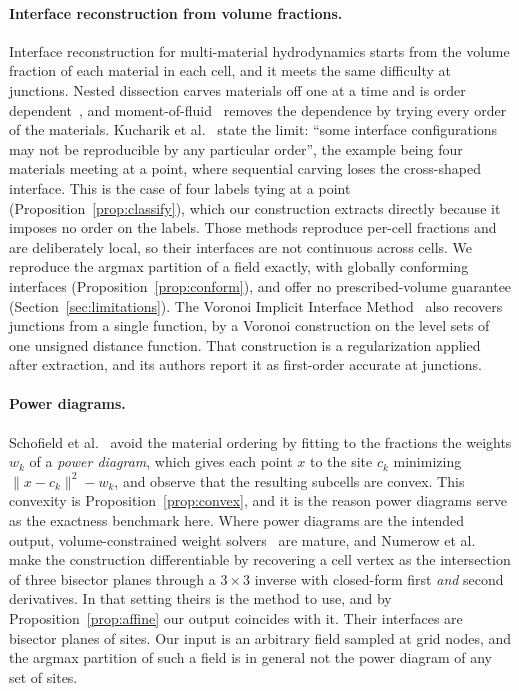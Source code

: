 \documentclass{egpubl}
\theoremstyle{definition}
\begin{document}
\paragraph{Interface reconstruction from volume fractions.}
Interface reconstruction for multi-material hydrodynamics starts from the
volume fraction of each material in each cell, and it meets the same
difficulty at junctions. Nested dissection carves materials off one at a time and is
order dependent~\cite{kucharik2010}, and moment-of-fluid~\cite{dyadechko2008}
removes the dependence by trying every order of the materials. Kucharik et
al.~\cite{kucharik2010} state the limit: ``some interface configurations may not
be reproducible by any particular order'', the example being four materials
meeting at a point, where sequential carving loses the cross-shaped interface.
This is the case of four labels tying at a point
(Proposition~\ref{prop:classify}), which our
construction extracts directly because it imposes no order on the labels.
Those methods reproduce per-cell fractions and are deliberately local, so
their interfaces are not continuous across cells. We reproduce the argmax
partition of a field exactly, with globally conforming interfaces
(Proposition~\ref{prop:conform}), and offer no prescribed-volume guarantee
(Section~\ref{sec:limitations}). The Voronoi Implicit Interface
Method~\cite{saye2011, saye2012} also recovers junctions from a single
function, by a Voronoi construction on the level sets of one unsigned
distance function. That construction is a regularization applied after
extraction, and its authors report it as first-order accurate at junctions.

\paragraph{Power diagrams.} Schofield et al.~\cite{schofield2008,
schofield2009} avoid the material ordering by fitting to the fractions the weights $w_k$
of a \emph{power diagram}, which gives each point $x$ to the site $c_k$
minimizing $\lVert x - c_k\rVert^2 - w_k$, and observe that the resulting subcells
are convex. This convexity is Proposition~\ref{prop:convex}, and it is the
reason power diagrams serve as the exactness benchmark here. Where power diagrams are the intended output, volume-constrained
weight solvers~\cite{degoes2015} are mature, and Numerow et
al.~\cite{numerow2024} make the construction differentiable by recovering a
cell vertex as the intersection of three bisector planes through a $3\times3$
inverse with closed-form first \emph{and} second derivatives. In that setting
theirs is the method to use, and by Proposition~\ref{prop:affine}
our output coincides with it. Their interfaces are bisector planes of sites.
Our input is an arbitrary field sampled at grid nodes, and the argmax
partition of such a field is in general not the power diagram of any set of
sites.
\end{document}
